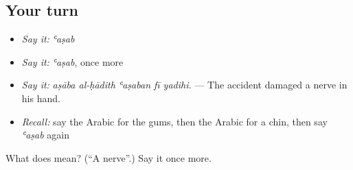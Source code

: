 \subsection*{Your turn}
\begin{itemize}
\raggedright
  \item \emph{Say it:} \emph{ʿaṣab}
  \item \emph{Say it:} \emph{ʿaṣab}, once more
  \item \emph{Say it:} \emph{aṣāba al-ḥādith ʿaṣaban fī yadihi.} — The accident damaged a nerve in his hand.
  \item \emph{Recall:} say the Arabic for the gums, then the Arabic for a chin, then say \emph{ʿaṣab} again
\end{itemize}

\begin{tcolorbox}[breakable,colback=teal!4,colframe=teal!35!black,title={Before you move on}]
What does  mean? (\textquotedblleft{}A nerve\textquotedblright{}.) Say it once more.
\end{tcolorbox}
